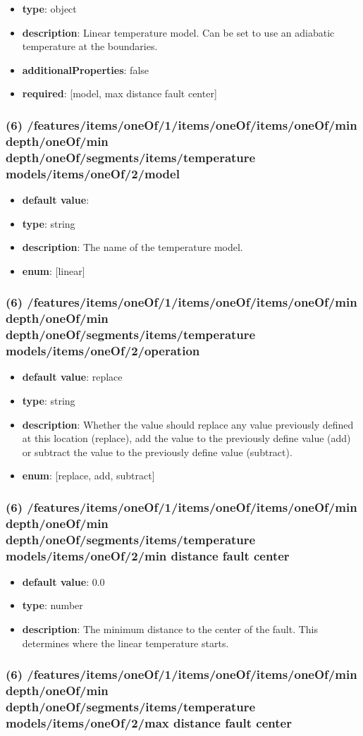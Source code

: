 \begin{itemize}[leftmargin=5em]\item {\bf type}: object
\item {\bf description}: Linear temperature model. Can be set to use an adiabatic temperature at the boundaries.
\item {\bf additionalProperties}: false
\item {\bf required}: [model, max distance fault center]\end{itemize}
\subsubsection{(6) /features/items/oneOf/1/items/oneOf/items/oneOf/min depth/oneOf/min depth/oneOf/segments/items/temperature models/items/oneOf/2/model}
\begin{itemize}[leftmargin=6em]\item {\bf default value}: 
\item {\bf type}: string
\item {\bf description}: The name of the temperature model.
\item {\bf enum}: [linear]\end{itemize}\subsubsection{(6) /features/items/oneOf/1/items/oneOf/items/oneOf/min depth/oneOf/min depth/oneOf/segments/items/temperature models/items/oneOf/2/operation}
\begin{itemize}[leftmargin=6em]\item {\bf default value}: replace
\item {\bf type}: string
\item {\bf description}: Whether the value should replace any value previously defined at this location (replace), add the value to the previously define value (add) or subtract the value to the previously define value (subtract).
\item {\bf enum}: [replace, add, subtract]\end{itemize}\subsubsection{(6) /features/items/oneOf/1/items/oneOf/items/oneOf/min depth/oneOf/min depth/oneOf/segments/items/temperature models/items/oneOf/2/min distance fault center}
\begin{itemize}[leftmargin=6em]\item {\bf default value}: 0.0
\item {\bf type}: number
\item {\bf description}: The minimum distance to the center of the fault. This determines where the linear temperature starts.
\end{itemize}\subsubsection{(6) /features/items/oneOf/1/items/oneOf/items/oneOf/min depth/oneOf/min depth/oneOf/segments/items/temperature models/items/oneOf/2/max distance fault center}
